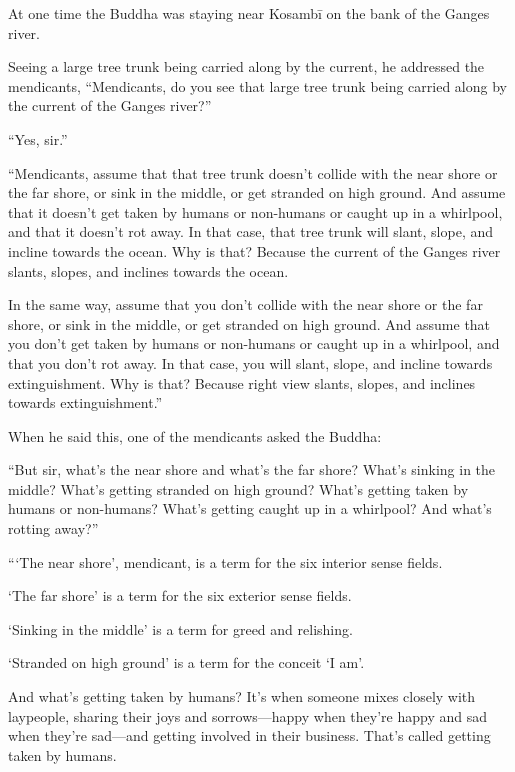 \documentclass[12pt,openany]{book}%
\begin{document}
At one time the Buddha was staying near \textsanskrit{Kosambī} on the bank of the Ganges river. 

Seeing a large tree trunk being carried along by the current, he addressed the mendicants, “Mendicants, do you see that large tree trunk being carried along by the current of the Ganges river?” 

“Yes, sir.” 

“Mendicants, assume that that tree trunk doesn’t collide with the near shore or the far shore, or sink in the middle, or get stranded on high ground. And assume that it doesn’t get taken by humans or non-humans or caught up in a whirlpool, and that it doesn’t rot away. In that case, that tree trunk will slant, slope, and incline towards the ocean. Why is that? Because the current of the Ganges river slants, slopes, and inclines towards the ocean. 

In the same way, assume that you don’t collide with the near shore or the far shore, or sink in the middle, or get stranded on high ground. And assume that you don’t get taken by humans or non-humans or caught up in a whirlpool, and that you don’t rot away. In that case, you will slant, slope, and incline towards extinguishment. Why is that? Because right view slants, slopes, and inclines towards extinguishment.” 

When he said this, one of the mendicants asked the Buddha: 

“But sir, what’s the near shore and what’s the far shore? What’s sinking in the middle? What’s getting stranded on high ground? What’s getting taken by humans or non-humans? What’s getting caught up in a whirlpool? And what’s rotting away?” 

“‘The near shore’, mendicant, is a term for the six interior sense fields. 

‘The far shore’ is a term for the six exterior sense fields. 

‘Sinking in the middle’ is a term for greed and relishing. 

‘Stranded on high ground’ is a term for the conceit ‘I am’. 

And what’s getting taken by humans? It’s when someone mixes closely with laypeople, sharing their joys and sorrows—happy when they’re happy and sad when they’re sad—and getting involved in their business. That’s called getting taken by humans. 
\end{document}

